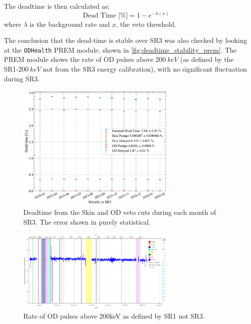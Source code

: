 The deadtime is then calculated as;
\begin{equation}
    \textrm{Dead Time [\%]} = 1 - e^{-\lambda (x)}
\end{equation}
where $\lambda$ is the background rate and $x$, the veto threshold.

The conclusion that the dead-time is stable over SR3 was also checked by looking at the \lstinline{ODHealth} PREM module, shown in \autoref{fig:deadtime_stability_prem}.
The PREM module shows the rate of OD pulses above $200~keV$ (as defined by the SR1-$200~keV$ not from the SR3 energy calibration), with no significant fluctuation during SR3.
\begin{figure}
    \centering
    \includegraphics[width=0.7\textwidth]{figures/VetoEfficiency/SR3DeadTimeAll_expoFunc.pdf}
    \caption{Deadtime from the Skin and OD veto cuts during each month of SR3. The error shown in purely statistical.}
    \label{fig:deadtime_stability}
\end{figure}
\begin{figure}
    \centering
    \includegraphics[width=0.7\textwidth]{figures/VetoEfficiency/prem_od_stability.png}
    \caption{Rate of OD pulses above 200keV as defined by SR1 not SR3.}
    \label{fig:deadtime_stability_prem}
\end{figure}

